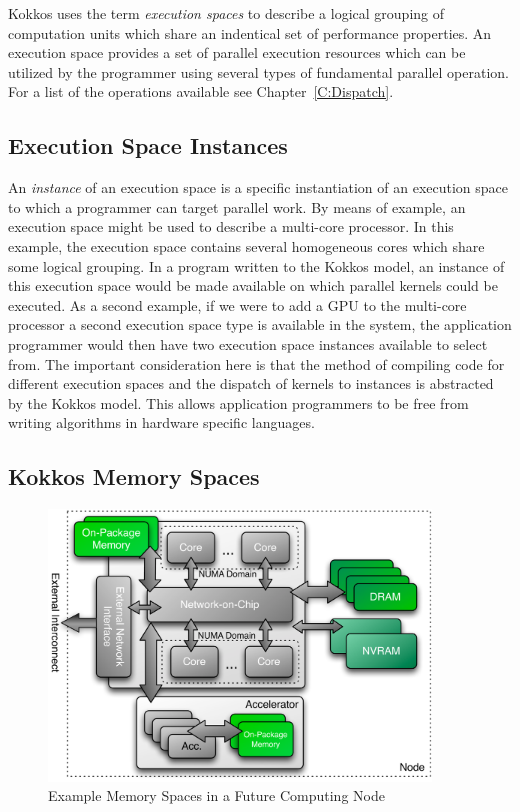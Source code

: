 Kokkos uses the term {\em execution spaces} to describe a logical
grouping of computation units which share an indentical set of
performance properties. An execution space provides a set of 
parallel execution resources which can be utilized by the
programmer using several types of fundamental parallel
operation. For a list of the operations available see
Chapter~\ref{C:Dispatch}.

\subsection{Execution Space Instances}

An {\em instance} of an execution space is a specific instantiation
of an execution space to which a programmer can target parallel
work. By means of example, an execution space might be used
to describe a multi-core processor. In this example, the
execution space contains several homogeneous cores which share
some logical grouping. In a program written to the Kokkos model,
an instance of this execution space would be made available
on which parallel kernels could be executed. As a second example,
if we were to add a GPU to the multi-core processor a second
execution space type is available in the system, the 
application programmer would then have two 
execution space instances available to select from. The
important consideration here is that the method of
compiling code for different execution spaces and the
dispatch of kernels to instances is abstracted by the Kokkos
model. 
This allows application programmers to be free from 
writing algorithms in hardware specific languages.

\subsection{Kokkos Memory Spaces}

\begin{figure}
\begin{center}
\includegraphics[width=4in]{figures/kokkos-memory-space.pdf}
\caption{Example Memory Spaces in a Future Computing Node}
\label{fig:kokkos_memory_spaces}
\end{center}
\end{figure}

